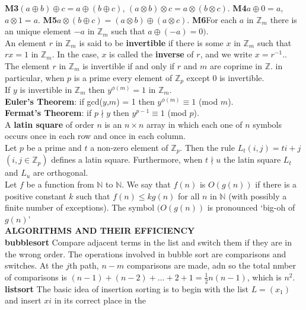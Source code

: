 \documentclass[10pt,landscape]{article}
\begin{document}
\begin{multicols}{4}
\textbf{M3}$(a \oplus b) \oplus c = a \oplus (b \oplus c)$, $(a
\otimes b) \otimes c = a \otimes (b \otimes c)$.
\textbf{M4}$a \oplus 0 = a$, $a \otimes 1 = a$.
\textbf{M5}$a \otimes (b \oplus c) = (a \otimes b) \oplus (a \otimes c)$.
\textbf{M6}For each $a$ in $\mathbb{Z}_{m}$ there is  an unique
element $-a$ in $\mathbb{Z}_{m}$ such that $a \oplus(-a) = 0)$.\\
An element $r$ in $\mathbb{Z}_{m}$ is said to be \textbf{invertible}
if there is some $x$ in $\mathbb{Z}_{m}$ such that $rx = 1$ in
$\mathbb{Z}_{m}$. In the case, $x$ is called the \textbf{inverse} of
$r$, and we write $x = r^{-1}.$.\\
The element $r$ in $\mathbb{Z}_{m}$ is invertible if and only if $r$
and $m$ are coprime in $\mathbb{Z}$. in particular, when $p$ is a
prime every element of $\mathbb{Z}_{p}$ except 0 is invertible.\\
If $y$ is invertible in $\mathbb{Z}_{m}$ then $y^{\phi (m)} = 1$ in
$\mathbb{Z}_{m}$.\\
\textbf{Euler's Theorem}: if gcd($y$,$m$) = 1 then $y^{\phi (m)}
\equiv 1$ (mod $m$).\\
\textbf{Fermat's Theorem}: if $p \nmid y$ then $y^{p-1} \equiv 1$ (mod
$p$).\\
A \textbf{latin square} of order $n$ is an $n \times n$ array in which
each one of $n$ symbols occurs once in each row and once in each
column.\\
Let $p$ be a prime and $t$ a non-zero element of
$\mathbb{Z}_{p}$. Then the rule $L_{t}(i,j) =ti+j$ $(i,j \in
\mathbb{Z}_{p})$ defines a latin square. Furthermore, when $t \nmid u$
the latin square $L_{t}$ and $L_{u}$ are orthogonal.\\
Let $f$ be a function from $\mathbb{N}$ to $\mathbb{N}$. We say that
$f(n)$ is $O(g(n))$ if there is a positive constant $k$ such that
$f(n) \leq kg(n)$ for all $n$ in $\mathbb{N}$ (with possibly a finite
number of exceptions). The symbol $(O(g(n))$ is pronounced `big-oh of
$g(n)$'\\
\textbf{ALGORITHMS AND THEIR EFFICIENCY}\\
\textbf{bubblesort} Compare adjacent terms in the list and switch them
if they are in the wrong order. The operations involved in bubble sort
are comparisons and switches. At the $j$th path, $n-m$ comparisons are
made, adn so the total nmber of comparisons is $(n-1)+(n-2)+ \dots + 2
+ 1 = \frac{1}{2}n(n-1)$, which is $n^{2}$.
\textbf{listsort} The basic idea of insertion sorting is to begin with
the list $L = (x_{1})$ and insert $x{i}$ in its correct place in the

\end{multicols}
\end{document}
